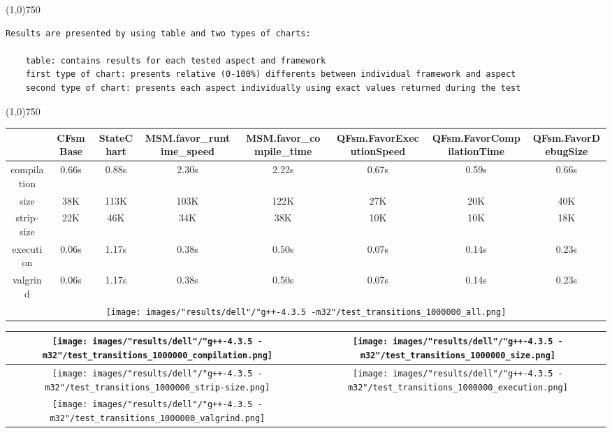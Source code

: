 \begin{center}
\line(1,0){750}
\end{center}
\begin{verbatim}
Results are presented by using table and two types of charts:

    table: contains results for each tested aspect and framework
    first type of chart: presents relative (0-100%) differents between individual framework and aspect
    second type of chart: presents each aspect individually using exact values returned during the test
\end{verbatim}
\begin{center}
\line(1,0){750}
\end{center}

\begin{landscape}
\begin{table}
\caption{"dell" [df6407d], g++-4.3.5 -m32/test transitions 1000000}
\centering
\begin{longtable}{| c | c |c |c |c |c |c |c |}
\hline
& CFsmBase& StateChart& MSM.favor\_runtime\_speed& MSM.favor\_compile\_time& QFsm.FavorExecutionSpeed& QFsm.FavorCompilationTime& QFsm.FavorDebugSize\\
\hline
compilation & 0.66s & 0.88s & 2.30s & 2.22s & 0.67s & 0.59s & 0.66s\\
\hline
size & 38K & 113K & 103K & 122K & 27K & 20K & 40K\\
\hline
strip-size & 22K & 46K & 34K & 38K & 10K & 10K & 18K\\
\hline
execution & 0.06s & 1.17s & 0.38s & 0.50s & 0.07s & 0.14s & 0.23s\\
\hline
valgrind & 0.06s & 1.17s & 0.38s & 0.50s & 0.07s & 0.14s & 0.23s\\
\hline
\multicolumn{8}{|c|}{\texttt{[image: images/"results/dell"/"g++-4.3.5 -m32"/test\_transitions\_1000000\_all.png]}}\\
\hline
\end{longtable}
\end{table}
\end{landscape}
\newpage
\begin{table}
\centering
\begin{longtable}{| c | c |}
\hline
\texttt{[image: images/"results/dell"/"g++-4.3.5 -m32"/test\_transitions\_1000000\_compilation.png]}& \texttt{[image: images/"results/dell"/"g++-4.3.5 -m32"/test\_transitions\_1000000\_size.png]}\\
\hline
\texttt{[image: images/"results/dell"/"g++-4.3.5 -m32"/test\_transitions\_1000000\_strip-size.png]}& \texttt{[image: images/"results/dell"/"g++-4.3.5 -m32"/test\_transitions\_1000000\_execution.png]}\\
\hline
\texttt{[image: images/"results/dell"/"g++-4.3.5 -m32"/test\_transitions\_1000000\_valgrind.png]}& \\ \hline
\end{longtable}
\end{table}
